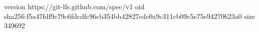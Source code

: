 version https://git-lfs.github.com/spec/v1
oid sha256:f5a47fdf9c79c6fdcdfc96cb354bb42827cdc0a9c311cb09c5e75e94270623a0
size 349692
